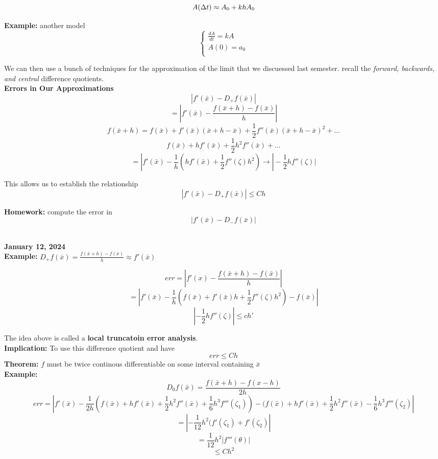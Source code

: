 \documentclass[10pt, AMS Euler]{article}
\begin{document}
\[    A(\Delta t) \approx A_0 + k h A_0\\
\]

\textbf{Example:} another model
\[ 
    \begin{cases}
        \frac{dA}{dt} = kA\\
        A(0) = a_0\\
    \end{cases}
\]

We can then use a bunch of techniques for the approximation of the limit that we discuessed last semester. recall the \textit{forward, backwards, and central} difference quotients.\\


\textbf{Errors in Our Approximations}\\

\[|f'(\bar{x}) - D_+f(\bar{x})| \]
\[= |f'(\bar{x}) - \frac{f(\bar{x} + h) - f(\bar{x})}{h}|\]
\[f(\bar{x} + h) = f(\bar{x}) + f'(\bar{x}) (\bar{x} + h - \bar{x}) + \frac{1}{2}f''(\bar{x})(\bar{x} + h - \bar{x})^2 + ...\]
\[f(\bar{x}) + h f'(\bar{x}) + \frac{1}{2} h^2 f''(\bar{x}) + ... \]
\[= | f'(\bar{x}) - \frac{1}{h} (h f'(\bar{x}) + \frac{1}{2} f''(\zeta) h^2) \rightarrow |-\frac{1}{2} h f''(\zeta)| \]

This allows us to establish the relationship
\[|f'(\bar{x}) - D_+ f(\bar{x}) | \leq Ch \]


\textbf{Homework:} compute the error in
\[ |f'(\bar{x}) - D_- f(\bar{x})| \]

\noindent \underline{\hspace{3in}}\\

\textbf{January 12, 2024}\\

\textbf{Example:} $D_+ f(\bar{x}) = \frac{f(\bar{x} + h) - f(\bar{x})}{h} \approx f'(\bar{x})$

\[err = |f'(x) - \frac{f(\bar{x} + h) - f(\bar{x})}{h}|\]
\[= |f'(\bar{x}) - \frac{1}{h}(f(\bar{x}) + f'(\bar{x})h + \frac{1}{2}f''(\zeta)h^2) - f(\bar{x})|\]
\[|-\frac{1}{2} h f''(\zeta)| \leq ch'\]


The idea above is called a \textbf{local truncatoin error analysis}.\\
\textbf{Implication:} To use this difference quotient and have
\[err \leq Ch\]
\textbf{Theorem:} $f$ must be twice continous differentiable on some interval containing $\bar{x}$\\

\textbf{Example:}
\[D_0f(\bar{x}) = \frac{f(\bar{x} + h) - f(x - h)}{2h} \]
\[err = |f'(\bar{x}) - \frac{1}{2h}(f(\bar{x}) + hf'(\bar{x}) + \frac{1}{2}h^2f''(\bar{x}) + \frac{1}{6}h^3 f'''(\zeta_1)) - (f(\bar{x}) +hf'(\bar{x}) + \frac{1}{2} h^2f''(\bar{x}) - \frac{1}{6} h^3 f'''(\zeta_2)|\]
\[= |- \frac{1}{12}h^2(f'(\zeta_1) + f'(\zeta_2)| \]
\[= \frac{1}{12} h^2 |f'''(\theta)|\]
\[\leq Ch^2\]
\end{document}

